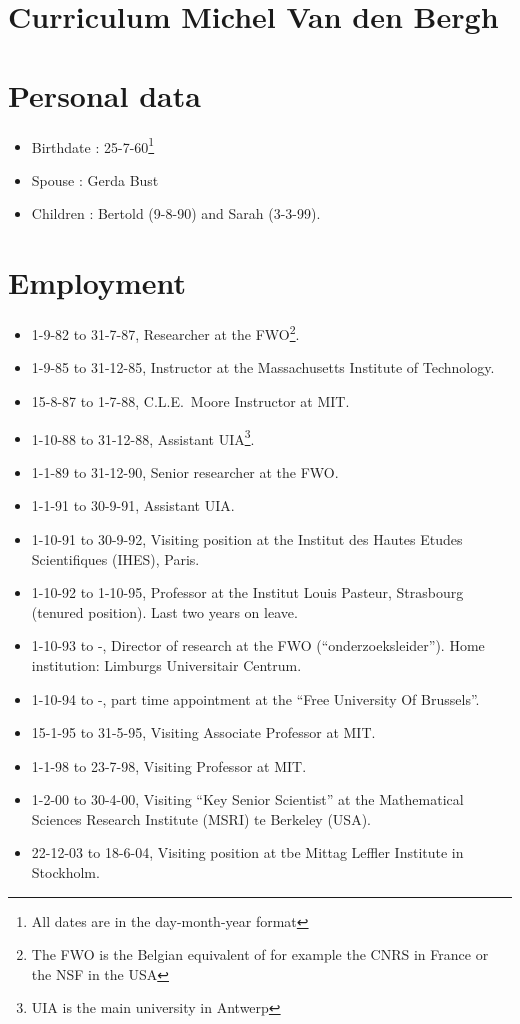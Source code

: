 \documentclass{amsart}
\begin{document}
\section*{Curriculum Michel Van den Bergh}
\section*{Personal data} \begin{itemize}
\item
Birthdate : 25-7-60\footnote{All dates are in the day-month-year
format}
\item
Spouse : Gerda Bust
\item
Children : Bertold (9-8-90) and Sarah (3-3-99).
\end{itemize}
\section*{Employment}
\begin{itemize}
\item
1-9-82 to 31-7-87, Researcher at the FWO\footnote{The FWO is the Belgian
equivalent of for example the CNRS in France or the NSF in the USA}.
\item
1-9-85 to 31-12-85, Instructor at the Massachusetts
Institute of Technology.
\item
15-8-87 to 1-7-88, C.L.E.~Moore Instructor at MIT.
\item
1-10-88 to 31-12-88, Assistant UIA\footnote{UIA is the main university in
Antwerp}.
\item
1-1-89 to 31-12-90, Senior researcher at the FWO.
\item
1-1-91 to 30-9-91, Assistant UIA.
\item
1-10-91 to 30-9-92, Visiting position at the Institut des Hautes Etudes
Scientifiques (IHES), Paris.
\item
1-10-92 to 1-10-95, Professor at the Institut Louis Pasteur,
Strasbourg (tenured position). Last two years on leave.
\item
1-10-93 to -, Director of research at the FWO
(``onderzoeksleider''). Home institution: Limburgs Universitair Centrum.
\item
1-10-94 to -, part time appointment at the ``Free University Of Brussels''.
\item
15-1-95 to 31-5-95, Visiting Associate Professor at MIT.
\item
1-1-98 to 23-7-98, Visiting Professor at MIT.
\item
1-2-00 to 30-4-00, Visiting ``Key Senior Scientist'' at the
Mathematical Sciences Research Institute (MSRI) te Berkeley (USA). 
\item 
22-12-03 to 18-6-04, Visiting position at tbe Mittag Leffler Institute in
Stockholm.
\end{itemize}
\end{document}

